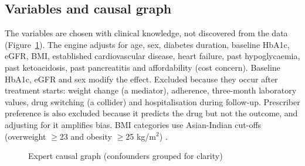 \subsection{Variables and causal graph}
The variables are chosen with clinical knowledge, not discovered from the data (Figure~\ref{fig:dag}). The engine adjusts for age, sex, diabetes duration, baseline HbA1c, eGFR, BMI, established cardiovascular disease, heart failure, past hypoglycaemia, past ketoacidosis, past pancreatitis and affordability (cost concern). Baseline HbA1c, eGFR and sex modify the effect. Excluded because they occur after treatment starts: weight change (a mediator), adherence, three-month laboratory values, drug switching (a collider) and hospitalisation during follow-up. Prescriber preference is also excluded because it predicts the drug but not the outcome, and adjusting for it amplifies bias. BMI categories use Asian-Indian cut-offs (overweight $\geq$23 and obesity $\geq$25 kg/m$^2$) \cite{misra2009}.
\begin{figure}[H]\centering
{}
\caption{Expert causal graph (confounders grouped for clarity)}\label{fig:dag}\end{figure}

